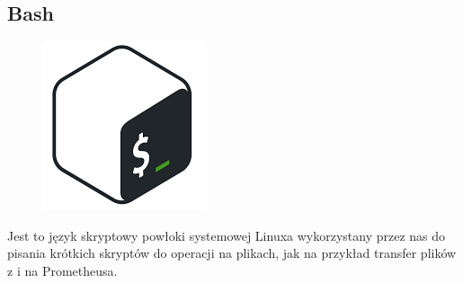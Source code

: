 \subsection{Bash}
\begin{figure}
\vspace{-4mm}
\includegraphics[width=\linewidth]{./images/bash.png} 
\vspace{-4mm}
\end{figure}
Jest to język skryptowy powłoki systemowej Linuxa wykorzystany przez nas do pisania krótkich skryptów
do operacji na plikach, jak na przykład transfer plików z i na Prometheusa.
